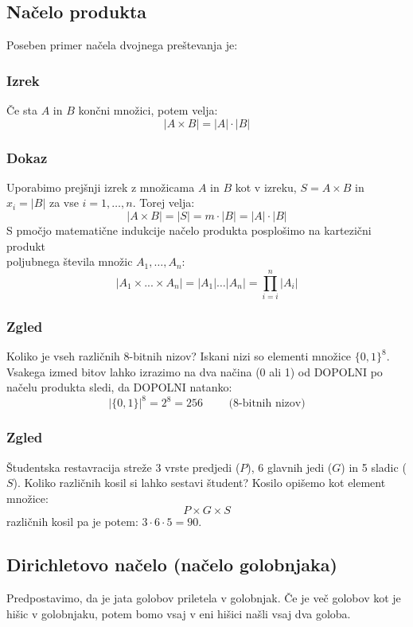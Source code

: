 \subsection{Načelo produkta}
Poseben primer načela dvojnega preštevanja je:

\subsubsection{Izrek}
Če sta $A$ in $B$ končni množici, potem velja:
$$
|A \times B| = |A| \cdot |B|
$$

\subsubsection{Dokaz}
Uporabimo prejšnji izrek z množicama $A$ in $B$ kot v izreku, $S = A \times B$ in \\
$x_i = |B|$ za vse $i = 1, \dots, n$. Torej velja:
$$
|A \times B| = |S| = m \cdot |B| = |A| \cdot |B| 
$$
S pmočjo matematične indukcije načelo produkta posplošimo na kartezični produkt \\
poljubnega števila množic $A_1, \dots, A_n$:
$$
|A_1 \times ... \times A_n| = |A_1| \dots |A_n| = \prod_{i = i}^{n} |A_i|
$$


\subsubsection{Zgled}
Koliko je vseh različnih 8-bitnih nizov? Iskani nizi so elementi množice $\{0, 1\}^8$. \\
Vsakega izmed bitov lahko izrazimo na dva načina (0 ali 1) od DOPOLNI po načelu produkta sledi, da DOPOLNI natanko:
$$
|\{0, 1\}|^8 = 2^8 = 256 \text{ } \text{ }\text{ } \text{ (8-bitnih nizov)}
$$

\subsubsection{Zgled}
Študentska restavracija streže 3 vrste predjedi ($P$), 6 glavnih jedi ($G$) in 5 sladic ($S$). Koliko različnih kosil si lahko sestavi študent? Kosilo opišemo kot element množice:
$$
P \times G \times S
$$
različnih kosil pa je potem: $3 \cdot 6 \cdot 5 = 90$.



\subsection{Dirichletovo načelo (načelo golobnjaka)}
Predpostavimo, da je jata golobov priletela v golobnjak. Če je več golobov kot je hišic v golobnjaku, potem bomo vsaj v eni hišici našli vsaj dva goloba.


